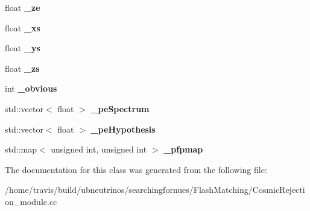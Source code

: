 \begin{DoxyCompactItemize}
\item 
float {\bfseries \+\_\+ze}\hypertarget{classCosmicRejection_a577912c55709ae4899aa9381034babe4}{}\label{classCosmicRejection_a577912c55709ae4899aa9381034babe4}

\item 
float {\bfseries \+\_\+xs}\hypertarget{classCosmicRejection_a3d9f8e6b3c8b618de508fe4fc0d481bd}{}\label{classCosmicRejection_a3d9f8e6b3c8b618de508fe4fc0d481bd}

\item 
float {\bfseries \+\_\+ys}\hypertarget{classCosmicRejection_aaec4fa1fe29d24b18e27bb90f23f5615}{}\label{classCosmicRejection_aaec4fa1fe29d24b18e27bb90f23f5615}

\item 
float {\bfseries \+\_\+zs}\hypertarget{classCosmicRejection_af6eb1f4fc0e76bd7767fee1853ea9df0}{}\label{classCosmicRejection_af6eb1f4fc0e76bd7767fee1853ea9df0}

\item 
int {\bfseries \+\_\+obvious}\hypertarget{classCosmicRejection_a67ce3a575fc7851f38c25e72b0fa5ba7}{}\label{classCosmicRejection_a67ce3a575fc7851f38c25e72b0fa5ba7}

\item 
std\+::vector$<$ float $>$ {\bfseries \+\_\+pe\+Spectrum}\hypertarget{classCosmicRejection_ad779ba81aabfa19efc0bb5ff510efc1f}{}\label{classCosmicRejection_ad779ba81aabfa19efc0bb5ff510efc1f}

\item 
std\+::vector$<$ float $>$ {\bfseries \+\_\+pe\+Hypothesis}\hypertarget{classCosmicRejection_a8a5730ec0de3b8a24c74a68a0da49933}{}\label{classCosmicRejection_a8a5730ec0de3b8a24c74a68a0da49933}

\item 
std\+::map$<$ unsigned int, unsigned int $>$ {\bfseries \+\_\+pfpmap}\hypertarget{classCosmicRejection_ab7db5d48133461aa8039101823987404}{}\label{classCosmicRejection_ab7db5d48133461aa8039101823987404}

\end{DoxyCompactItemize}


The documentation for this class was generated from the following file\+:\begin{DoxyCompactItemize}
\item 
/home/travis/build/ubneutrinos/searchingfornues/\+Flash\+Matching/Cosmic\+Rejection\+\_\+module.\+cc\end{DoxyCompactItemize}
